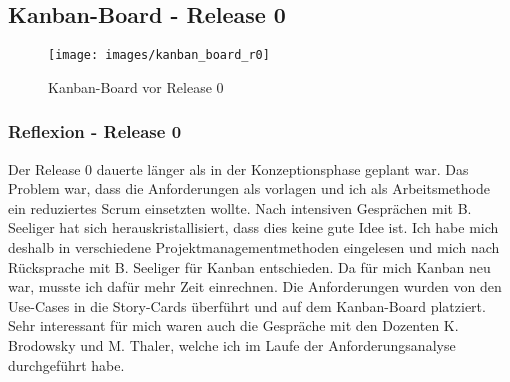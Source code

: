 


\begin{landscape}

\subsection{Kanban-Board - Release 0}

\begin{figure}[h!]
	\begin{center}
		\texttt{[image: images/kanban\_board\_r0]}
	\end{center}
   \caption[Kanban-Board - Release 0]{Kanban-Board vor Release 0}
   \label{fig:kanban_r0}
\end{figure}


\end{landscape}
\restoregeometry

\subsubsection{Reflexion - Release 0}

Der Release 0 dauerte länger als in der Konzeptionsphase geplant war. Das Problem war, dass die Anforderungen als  vorlagen
und ich als Arbeitsmethode ein reduziertes Scrum einsetzten wollte. Nach intensiven Gesprächen mit B. Seeliger hat sich herauskristallisiert, dass dies
keine gute Idee ist. Ich habe mich deshalb in verschiedene Projektmanagementmethoden eingelesen und mich nach Rücksprache mit B. Seeliger für Kanban
entschieden. Da für mich Kanban neu war, musste ich dafür mehr Zeit einrechnen. Die Anforderungen wurden von den Use-Cases in die Story-Cards überführt
und auf dem Kanban-Board platziert. Sehr interessant für mich waren auch die Gespräche mit den Dozenten
K. Brodowsky und M. Thaler, welche ich im Laufe der Anforderungsanalyse durchgeführt habe. \\


